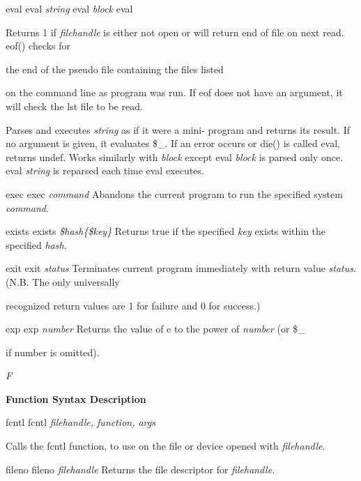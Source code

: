 \documentclass[a4paper,11pt]{book}
\begin{document}
\noindent eval eval \textit{string }eval \textit{block }eval

\noindent 

\noindent Returns 1 if \textit{filehandle }is either not open or will return end of file on next read. eof() checks for

\noindent the end of the pseudo file containing the files listed

\noindent on the command line as program was run. If eof does not have an argument, it will check the lst file to be read.

\noindent 

\noindent Parses and executes \textit{string }as if it were a mini- program and returns its result. If no argument is given, it evaluates \$\_. If an error occurs or die() is called eval, returns undef. Works similarly with \textit{block }except eval \textit{block }is parsed only once. eval \textit{string }is reparsed each time eval executes.

\noindent exec exec \textit{command }Abandons the current program to run the specified system \textit{command}.

\noindent 

\noindent exists exists \textit{\$hash\{\$key\} }Returns true if the specified \textit{key }exists within the specified \textit{hash}.

\noindent exit exit \textit{status }Terminates current program immediately with return value \textit{status}. (N.B. The only universally

\noindent recognized return values are 1 for failure and 0 for success.)

\noindent exp exp \textit{number }Returns the value of e to the power of \textit{number }(or \$\_

\noindent if number is omitted).

\noindent 

\noindent \textit{F}

\noindent 

\noindent \textbf{Function Syntax Description}

\noindent 

\noindent fcntl fcntl  \textit{filehandle, function, args}

\noindent 

\noindent Calls the fcntl function, to use on the file or device opened with \textit{filehandle}.

\noindent fileno fileno \textit{filehandle }Returns the file descriptor for \textit{filehandle.}
\end{document}
